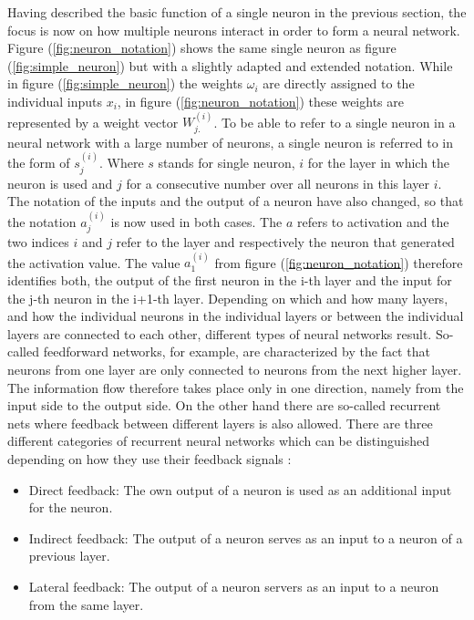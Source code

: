 Having described the basic function of a single neuron in the previous section, the focus is now on how multiple neurons interact in order to form a neural network. Figure (\ref{fig:neuron_notation}) shows the same single neuron as figure (\ref{fig:simple_neuron}) but with a slightly adapted and extended notation. While in figure (\ref{fig:simple_neuron}) the weights $\omega_i$ are directly assigned to the individual inputs $x_i$, in figure (\ref{fig:neuron_notation}) these weights are represented by a weight vector $W_{j.}^{(i)}$. To be able to refer to a single neuron in a neural network with a large number of neurons, a single neuron is referred to in the form of $s_j^{(i)}$. Where $s$ stands for single neuron, $i$ for the layer in which the neuron is used and $j$ for a consecutive number over all neurons in this layer $i$. The notation of the inputs and the output of a neuron have also changed, so that the notation $a_j^{(i)}$ is now used in both cases. The $a$ refers to activation and the two indices $i$ and $j$ refer to the layer and respectively the neuron that generated the activation value. The value $a_1^{(i)}$ from figure (\ref{fig:neuron_notation}) therefore identifies both, the output of the first neuron in the i-th layer and the input for the j-th neuron in the i+1-th layer. Depending on which and how many layers, and how the individual neurons in the individual layers or between the individual layers are connected to each other, different types of neural networks result. So-called feedforward networks, for example, are characterized by the fact that neurons from one layer are only connected to neurons from the next higher layer. The information flow therefore takes place only in one direction, namely from the input side to the output side. On the other hand there are so-called recurrent nets where feedback between different layers is also allowed. There are three different categories of recurrent neural networks which can be distinguished depending on how they use their feedback signals \cite{rek_net}: 

\begin{itemize}
	\item Direct feedback: The own output of a neuron is used as an additional input for the neuron.
	\item Indirect feedback: The output of a neuron serves as an input to a neuron of a previous layer.
	\item Lateral feedback: The output of a neuron servers as an input to a neuron from the same layer.
\end{itemize}


